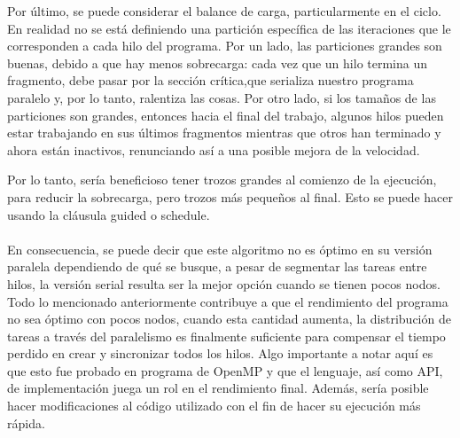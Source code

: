 \documentclass[11pt]{article}
\begin{document}
\par
Por último, se puede considerar el balance de carga, particularmente en el ciclo. En realidad no se está definiendo una partición específica de las iteraciones que le corresponden a cada hilo del programa. Por un lado, las particiones grandes son buenas, debido a que hay menos sobrecarga: cada vez que un hilo termina un fragmento, debe pasar por la sección crítica,que serializa nuestro programa paralelo y, por lo tanto, ralentiza las cosas. Por otro lado, si los tamaños de las particiones son grandes, entonces hacia el final del trabajo, algunos hilos pueden estar trabajando en sus últimos fragmentos mientras que otros han terminado y ahora están inactivos, renunciando así a una posible mejora de la velocidad.
\par
Por lo tanto, sería beneficioso tener trozos grandes al comienzo de la ejecución, para reducir la sobrecarga, pero trozos más pequeños al final. 
Esto se puede hacer usando la cláusula guided o schedule.

\paragraph{}
En consecuencia, se puede decir que este algoritmo no es óptimo en su versión paralela dependiendo de qué se busque, a pesar de segmentar las tareas entre hilos, la versión serial resulta ser la mejor opción cuando se tienen pocos nodos. Todo lo mencionado anteriormente contribuye a que el rendimiento del programa no sea óptimo con pocos nodos, cuando esta cantidad aumenta, la distribución de tareas a través del paralelismo es finalmente suficiente para compensar el tiempo perdido en crear y sincronizar todos los hilos. Algo importante a notar aquí es que esto fue probado en programa de OpenMP y que el lenguaje, así como API, de implementación juega un rol en el rendimiento final. Además, sería posible hacer modificaciones al código utilizado con el fin de hacer su ejecución más rápida.
\end{document}
